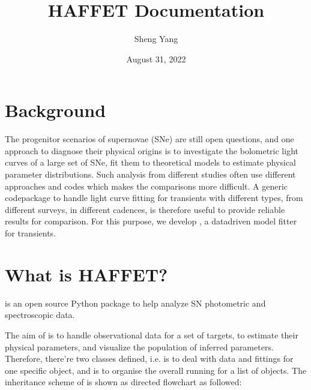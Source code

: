 \documentclass[letterpaper,10pt,english]{sphinxmanual}
\title{HAFFET Documentation}
\date{August 31, 2022}
\author{Sheng Yang}
\let\sphinxpxdimen\pdfpxdimen\else\newdimen\sphinxpxdimen
\begin{document}
\pagestyle{empty}
\sphinxmaketitle
\pagestyle{plain}
\sphinxtableofcontents
\pagestyle{normal}
\label{\detokenize{index::doc}}



\chapter{Background}
\label{\detokenize{index:background}}
The progenitor scenarios of supernovae (SNe) are still open questions, and one approach to diagnose their physical origins is to investigate the bolometric light curves of a large set of SNe, fit them to theoretical models to estimate physical parameter distributions.
Such analysis from different studies often use different approaches and codes which makes the comparisons more difficult. A generic code\sphinxhyphen{}package to handle light curve fitting for transients with different types, from different surveys, in different cadences, is therefore useful to provide reliable results for comparison. For this purpose, we develop , a data\sphinxhyphen{}driven model fitter for transients.


\chapter{What is HAFFET?}
\label{\detokenize{index:what-is-haffet}}
 is an open source Python package to help analyze SN photometric and spectroscopic data.

The aim of  is to handle observational data for a set of targets, to estimate their physical parameters, and visualize the population of inferred parameters. Therefore, there’re two classes defined, i.e.  is to deal with data and fittings for one specific object, and  is to organise the overall running for a list of objects. The inheritance scheme of  is shown as directed flowchart as followed:

\noindent\sphinxincludegraphics[width=800\sphinxpxdimen]{{sdapy}.png}
\end{document}
